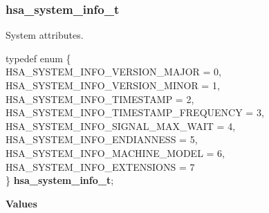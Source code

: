 \documentclass[final,oneside]{book}
\newcommand{\reftyp}[1]{#1}
\newcommand{\refenu}[1]{\reftyp{#1}}
\newenvironment{mylongtable}{\rowcolors{0}{lightgray}{lightgray}\longtable} {
\endlongtable}
\begin{document}
\subsubsection{hsa_\-system_\-info_\-t}
\vspace{-2.5mm}System attributes.\begin{mylongtable}{@{}p{\textwidth}}
\rule{0pt}{3ex}typedef enum \{\\\hspace{1.7em}\hypertarget{group__agentinfo_1gga5358716e320ad8a78b78ef44d8783b0bac33519a29a9fa32f1dd179b9f8af8243}{\refenu{HSA_\-SYSTEM_\-INFO_\-VERSION_\-MAJOR}} = 0,\\
\hspace{1.7em}\hypertarget{group__agentinfo_1gga5358716e320ad8a78b78ef44d8783b0ba0ac419f557187a4cfcdeb604f37bb4ae}{\refenu{HSA_\-SYSTEM_\-INFO_\-VERSION_\-MINOR}} = 1,\\
\hspace{1.7em}\hypertarget{group__agentinfo_1gga5358716e320ad8a78b78ef44d8783b0bac9043678e4c1dd887fcf71cabee228f6}{\refenu{HSA_\-SYSTEM_\-INFO_\-TIMESTAMP}} = 2,\\
\hspace{1.7em}\hypertarget{group__agentinfo_1gga5358716e320ad8a78b78ef44d8783b0bae2a8bb2c1322968a95b8ed49c34d54f5}{\refenu{HSA_\-SYSTEM_\-INFO_\-TIMESTAMP_\-FREQUENCY}} = 3,\\
\hspace{1.7em}\hypertarget{group__agentinfo_1gga5358716e320ad8a78b78ef44d8783b0ba851f3f7745ed5524352598d2a0f02e9a}{\refenu{HSA_\-SYSTEM_\-INFO_\-SIGNAL_\-MAX_\-WAIT}} = 4,\\
\hspace{1.7em}\hypertarget{group__agentinfo_1gga5358716e320ad8a78b78ef44d8783b0baa03b4fd983e67ce6d3c8a63dceb9134a}{\refenu{HSA_\-SYSTEM_\-INFO_\-ENDIANNESS}} = 5,\\
\hspace{1.7em}\hypertarget{group__agentinfo_1gga5358716e320ad8a78b78ef44d8783b0ba967398d64a854866b896e1709c222568}{\refenu{HSA_\-SYSTEM_\-INFO_\-MACHINE_\-MODEL}} = 6,\\
\hspace{1.7em}\hypertarget{group__agentinfo_1gga5358716e320ad8a78b78ef44d8783b0ba7e873d31af73c552272aad520d8dcbef}{\refenu{HSA_\-SYSTEM_\-INFO_\-EXTENSIONS}} = 7\\
\} \hypertarget{group__agentinfo_1ga5358716e320ad8a78b78ef44d8783b0b}{\textbf{hsa_\-system_\-info_\-t}};\rule[-2ex]{0pt}{0pt}\end{mylongtable}\noindent\textbf{Values}\\[-7mm]
\end{document}
